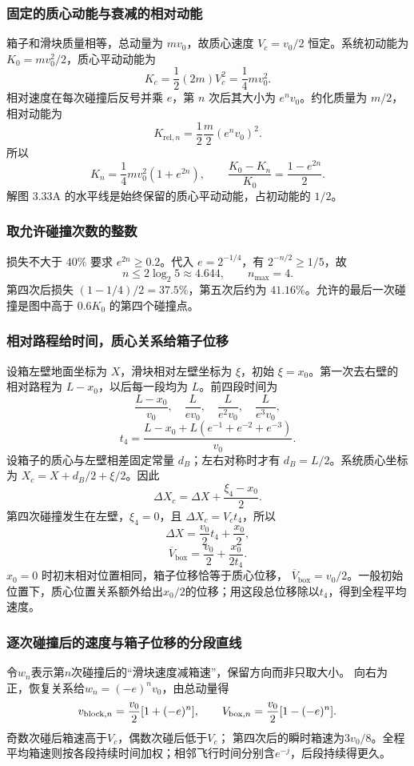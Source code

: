 \documentclass[UTF8,fontset=fandol,a4paper,11pt]{ctexart}
\begin{document}
\subsubsection*{固定的质心动能与衰减的相对动能}
箱子和滑块质量相等，总动量为 $mv_0$，故质心速度
$V_c=v_0/2$ 恒定。系统初动能为 $K_0=mv_0^2/2$，质心平动动能为
\[
K_c=\frac12(2m)V_c^2=\frac14mv_0^2.
\]
相对速度在每次碰撞后反号并乘 $e$，第 $n$ 次后其大小为 $e^nv_0$。约化质量为 $m/2$，相对动能为
\[
K_{\mathrm{rel},n}=\frac12\frac m2(e^nv_0)^2.
\]
所以
\[
K_n=\frac14mv_0^2(1+e^{2n}),\qquad
\frac{K_0-K_n}{K_0}=\frac{1-e^{2n}}2.
\]
解图 3.33A 的水平线是始终保留的质心平动动能，占初动能的 $1/2$。

\subsubsection*{取允许碰撞次数的整数}
损失不大于 $40\%$ 要求 $e^{2n}\geq0.2$。代入
$e=2^{-1/4}$，有 $2^{-n/2}\geq1/5$，故
\[
n\leq2\log_2 5\approx4.644,\qquad
\boxed{n_{\max}=4}.
\]
第四次后损失 $(1-1/4)/2=37.5\%$，第五次后约为 $41.16\%$。允许的最后一次碰撞是图中高于 $0.6K_0$ 的第四个碰撞点。

\subsubsection*{相对路程给时间，质心关系给箱子位移}
设箱左壁地面坐标为 $X$，滑块相对左壁坐标为 $\xi$，初始 $\xi=x_0$。第一次去右壁的相对路程为 $L-x_0$，以后每一段均为 $L$。前四段时间为
\[
\frac{L-x_0}{v_0},\quad\frac{L}{ev_0},\quad
\frac{L}{e^2v_0},\quad\frac{L}{e^3v_0},
\]
\[
t_4=\frac{L-x_0+L(e^{-1}+e^{-2}+e^{-3})}{v_0}.
\]
设箱子的质心与左壁相差固定常量 $d_B$；左右对称时才有 $d_B=L/2$。系统质心坐标为
$X_c=X+d_B/2+\xi/2$。因此
\[
\Delta X_c=\Delta X+\frac{\xi_4-x_0}{2}.
\]
第四次碰撞发生在左壁，$\xi_4=0$，且 $\Delta X_c=V_ct_4$，所以
\[
\Delta X=\frac{v_0}{2}t_4+\frac{x_0}{2},
\]
\[
\boxed{\overline V_{\mathrm{box}}=
\frac{v_0}{2}+\frac{x_0}{2t_4}}.
\]
$x_0=0$ 时初末相对位置相同，箱子位移恰等于质心位移，
$\overline V_{\mathrm{box}}=v_0/2$。一般初始位置下，质心位置关系额外给出$x_0/2$的位移；用这段总位移除以$t_4$，得到全程平均速度。
\subsubsection*{逐次碰撞后的速度与箱子位移的分段直线}
令$w_n$表示第$n$次碰撞后的“滑块速度减箱速”，保留方向而非只取大小。
向右为正，恢复关系给$w_n=(-e)^nv_0$，由总动量得
\[
v_{{\rm block},n}=\frac{v_0}{2}[1+(-e)^n],\qquad
V_{{\rm box},n}=\frac{v_0}{2}[1-(-e)^n].
\]
奇数次碰后箱速高于$V_c$，偶数次碰后低于$V_c$；
第四次后的瞬时箱速为$3v_0/8$。全程平均箱速则按各段持续时间加权；相邻飞行时间分别含$e^{-j}$，后段持续得更久。
\end{document}
